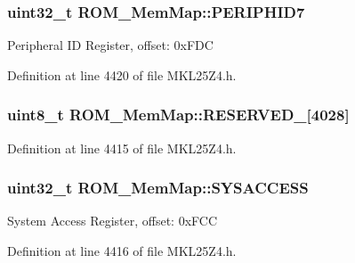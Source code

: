 \subsubsection[{\texorpdfstring{P\+E\+R\+I\+P\+H\+I\+D7}{PERIPHID7}}]{\setlength{\rightskip}{0pt plus 5cm}uint32\+\_\+t R\+O\+M\+\_\+\+Mem\+Map\+::\+P\+E\+R\+I\+P\+H\+I\+D7}\hypertarget{struct_r_o_m___mem_map_af744edcf30aecea70b419fce22ee5299}{}\label{struct_r_o_m___mem_map_af744edcf30aecea70b419fce22ee5299}
Peripheral ID Register, offset\+: 0x\+F\+DC 

Definition at line 4420 of file M\+K\+L25\+Z4.\+h.

\subsubsection[{\texorpdfstring{R\+E\+S\+E\+R\+V\+E\+D\+\_\+0}{RESERVED_0}}]{\setlength{\rightskip}{0pt plus 5cm}uint8\+\_\+t R\+O\+M\+\_\+\+Mem\+Map\+::\+R\+E\+S\+E\+R\+V\+E\+D\+\_\mbox{[}4028\mbox{]}}\hypertarget{struct_r_o_m___mem_map_a086169a392fc8eedf1d3a111b034fa69}{}\label{struct_r_o_m___mem_map_a086169a392fc8eedf1d3a111b034fa69}


Definition at line 4415 of file M\+K\+L25\+Z4.\+h.

\subsubsection[{\texorpdfstring{S\+Y\+S\+A\+C\+C\+E\+SS}{SYSACCESS}}]{\setlength{\rightskip}{0pt plus 5cm}uint32\+\_\+t R\+O\+M\+\_\+\+Mem\+Map\+::\+S\+Y\+S\+A\+C\+C\+E\+SS}\hypertarget{struct_r_o_m___mem_map_a08aba21ee3870b9eea15463bf46411a4}{}\label{struct_r_o_m___mem_map_a08aba21ee3870b9eea15463bf46411a4}
System Access Register, offset\+: 0x\+F\+CC 

Definition at line 4416 of file M\+K\+L25\+Z4.\+h.

